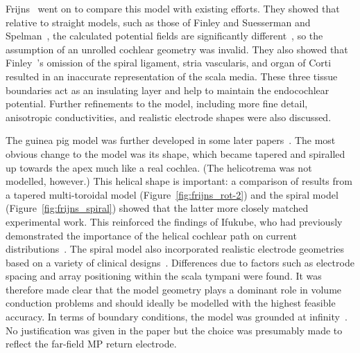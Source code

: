 Frijns~\etal{} went on to compare this model with existing efforts. They showed
that relative to straight models, such as those of Finley \etal\cite{finley1990}
and Suesserman and Spelman~\cite{suesserman1993}, the calculated potential
fields are significantly different~\cite{frijns1995}, so the assumption of an
unrolled cochlear geometry was invalid. They also showed that Finley~\etal's
omission of the spiral ligament, stria vascularis, and organ of Corti resulted
in an inaccurate representation of the scala media. These three tissue
boundaries act as an insulating layer and help to maintain the endocochlear
potential. Further refinements to the model, including more fine detail,
anisotropic conductivities, and realistic electrode shapes were also discussed.

The guinea pig model was further developed in some later
papers~\cite{briaire2000mesh,briaire2000field,frijns2000}. The most obvious
change to the model was its shape, which became tapered and spiralled up towards
the apex much like a real cochlea. (The helicotrema was not modelled, however.)
This helical shape is important: a comparison of results from a tapered
multi-toroidal model (Figure~\ref{fig:frijns_rot-2}) and the spiral model
(Figure~\ref{fig:frijns_spiral}) showed that the latter more closely matched
experimental work. This reinforced the findings of Ifukube, who had previously
demonstrated the importance of the helical cochlear path on current
distributions~\cite{ifukube1987}. The spiral model also incorporated realistic
electrode geometries based on a variety of clinical designs~\cite{frijns2000}.
Differences due to factors such as electrode spacing and array positioning
within the scala tympani were found. It was therefore made clear that the model
geometry plays a dominant role in volume conduction problems and should ideally
be modelled with the highest feasible accuracy. In terms of boundary conditions,
the model was grounded at infinity~\cite{frijns2000}. No justification was given
in the paper but the choice was presumably made to reflect the far-field MP
return electrode.

